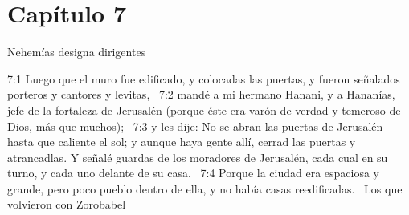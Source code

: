 \section*{Capítulo 7}
Nehemías designa dirigentes  

7:1 Luego que el muro fue edificado, y colocadas las puertas, y fueron señalados porteros y cantores y levitas,  
7:2 mandé a mi hermano Hanani, y a Hananías, jefe de la fortaleza de Jerusalén (porque éste era varón de verdad y temeroso de Dios, más que muchos);  
7:3 y les dije: No se abran las puertas de Jerusalén hasta que caliente el sol; y aunque haya gente allí, cerrad las puertas y atrancadlas. Y señalé guardas de los moradores de Jerusalén, cada cual en su turno, y cada uno delante de su casa.  
7:4 Porque la ciudad era espaciosa y grande, pero poco pueblo dentro de ella, y no había casas reedificadas.  
Los que volvieron con Zorobabel  

